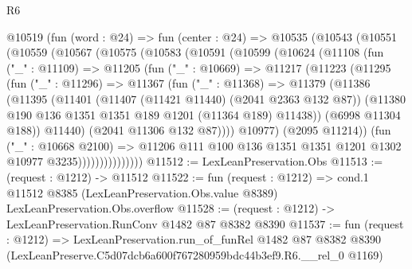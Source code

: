 \begin{lexlean}{R6}
\begin{coremodule}
      @10519
        (fun (word : @24) =>
        fun (center : @24) =>
        @10535
          (@10543
            (@10551
              (@10559
                (@10567
                  (@10575
                    (@10583
                      (@10591
                        (@10599
                          (@10624
                            (@11108
                              (fun ("_" : @11109) =>
                              @11205
                                (fun ("_" : @10669) =>
                                @11217
                                  (@11223
                                    (@11295
                                      (fun ("_" : @11296) =>
                                      @11367
                                        (fun ("_" : @11368) =>
                                        @11379
                                          (@11386
                                            (@11395
                                              (@11401
                                                (@11407 (@11421 @11440) (@2041 @2363 @132 @87))
                                                (@11380
                                                  @190
                                                  @136
                                                  @1351
                                                  @1351
                                                  @189
                                                  @1201
                                                  (@11364 @189)
                                                  @11438))
                                              (@6998 @11304 @188))
                                            @11440)
                                          (@2041 @11306 @132 @87))))
                                    @10977)
                                  (@2095 @11214))
                                (fun ("_" : @10668 @2100) =>
                                @11206
                                  @111
                                  @100
                                  @136
                                  @1351
                                  @1351
                                  @1201
                                  @1302
                                  @10977
                                  @3235)))))))))))))))
@11512 := LexLeanPreservation.Obs
@11513 := (request : @1212) -> @11512
@11522 := fun (request : @1212) =>
  cond.{1} @11512 @8385 (LexLeanPreservation.Obs.value @8389) LexLeanPreservation.Obs.overflow
@11528 := (request : @1212) -> LexLeanPreservation.RunConv @1482 @87 @8382 @8390
@11537 := fun (request : @1212) =>
  LexLeanPreservation.run_of_funRel
    @1482
    @87
    @8382
    @8390
    (LexLeanPreserve.C5d07dcb6a600f767280959bdc44b3ef9.R6.__rel_0 @1169)
\end{coremodule}
\end{lexlean}
